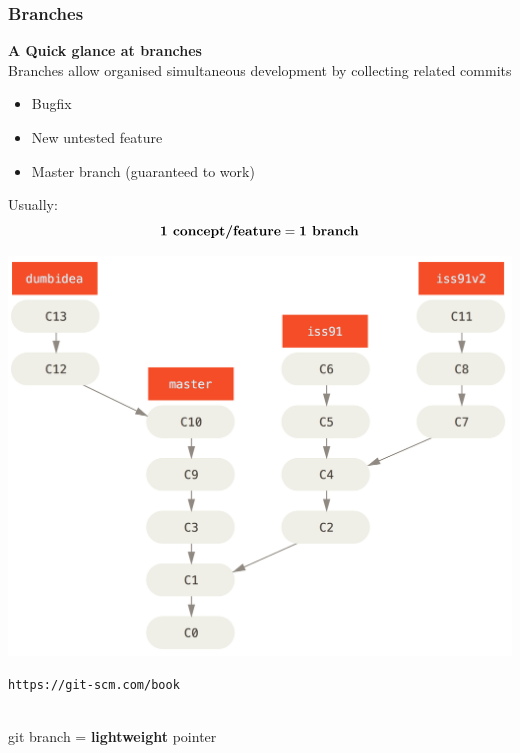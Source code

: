 \documentclass{beamer}
\begin{document}
\begin{frame}
  \frametitle{Branches}
  \textbf{\Large A Quick glance at branches}\\[1ex]
  Branches allow organised simultaneous development by collecting related 
  commits\\
  \begin{minipage}{0.45\linewidth}
  \begin{itemize}
    \item Bugfix
    \item New untested feature
    \item Master branch (guaranteed to work)
  \end{itemize}
  Usually:
  \begin{equation*}
    \text{\textbf{1 concept/feature}} = \text{\textbf{1 branch}}
  \end{equation*}
  \end{minipage}
  \hfill
  \begin{minipage}{0.45\linewidth}
  \begin{center}
    \includegraphics[width=0.95\linewidth]{topic-branches-1.png}
  \end{center}
  {\footnotesize \texttt{https://git-scm.com/book}}
  \end{minipage}\\[2ex]
  git branch = \textbf{lightweight} pointer
\end{frame}

\end{document}
